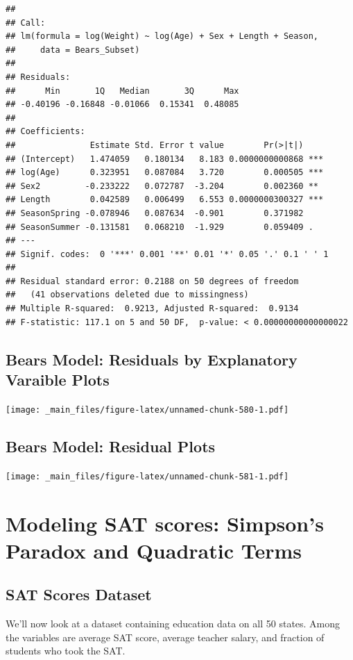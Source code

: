 \documentclass[]{book}
\begin{document}
\begin{verbatim}
## 
## Call:
## lm(formula = log(Weight) ~ log(Age) + Sex + Length + Season, 
##     data = Bears_Subset)
## 
## Residuals:
##      Min       1Q   Median       3Q      Max 
## -0.40196 -0.16848 -0.01066  0.15341  0.48085 
## 
## Coefficients:
##               Estimate Std. Error t value        Pr(>|t|)    
## (Intercept)   1.474059   0.180134   8.183 0.0000000000868 ***
## log(Age)      0.323951   0.087084   3.720        0.000505 ***
## Sex2         -0.233222   0.072787  -3.204        0.002360 ** 
## Length        0.042589   0.006499   6.553 0.0000000300327 ***
## SeasonSpring -0.078946   0.087634  -0.901        0.371982    
## SeasonSummer -0.131581   0.068210  -1.929        0.059409 .  
## ---
## Signif. codes:  0 '***' 0.001 '**' 0.01 '*' 0.05 '.' 0.1 ' ' 1
## 
## Residual standard error: 0.2188 on 50 degrees of freedom
##   (41 observations deleted due to missingness)
## Multiple R-squared:  0.9213, Adjusted R-squared:  0.9134 
## F-statistic: 117.1 on 5 and 50 DF,  p-value: < 0.00000000000000022
\end{verbatim}

\subsection{Bears Model: Residuals by Explanatory Varaible
Plots}\label{bears-model-residuals-by-explanatory-varaible-plots-1}

\texttt{[image: \_main\_files/figure-latex/unnamed-chunk-580-1.pdf]}

\subsection{Bears Model: Residual
Plots}\label{bears-model-residual-plots}

\texttt{[image: \_main\_files/figure-latex/unnamed-chunk-581-1.pdf]}

\section{Modeling SAT scores: Simpson's Paradox and Quadratic
Terms}\label{modeling-sat-scores-simpsons-paradox-and-quadratic-terms}

\subsection{SAT Scores Dataset}\label{sat-scores-dataset}

We'll now look at a dataset containing education data on all 50 states.
Among the variables are average SAT score, average teacher salary, and
fraction of students who took the SAT.
\end{document}
